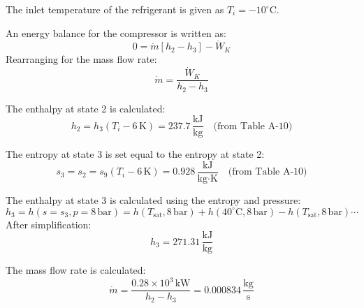 The inlet temperature of the refrigerant is given as \( T_i = -10^\circ\text{C} \).  

An energy balance for the compressor is written as:  
\[
0 = \dot{m} [h_2 - h_3] - \dot{W}_K
\]  
Rearranging for the mass flow rate:  
\[
\dot{m} = \frac{\dot{W}_K}{h_2 - h_3}
\]  

The enthalpy at state 2 is calculated:  
\[
h_2 = h_3(T_i - 6 \, \text{K}) = 237.7 \, \frac{\text{kJ}}{\text{kg}} \quad \text{(from Table A-10)}
\]  

The entropy at state 3 is set equal to the entropy at state 2:  
\[
s_3 = s_2 = s_9(T_i - 6 \, \text{K}) = 0.928 \, \frac{\text{kJ}}{\text{kg·K}} \quad \text{(from Table A-10)}
\]  

The enthalpy at state 3 is calculated using the entropy and pressure:  
\[
h_3 = h(s = s_3, p = 8 \, \text{bar}) = h(T_{\text{sat}}, 8 \, \text{bar}) + h(40^\circ\text{C}, 8 \, \text{bar}) - h(T_{\text{sat}}, 8 \, \text{bar}) \cdots
\]  
After simplification:  
\[
h_3 = 271.31 \, \frac{\text{kJ}}{\text{kg}}
\]  

The mass flow rate is calculated:  
\[
\dot{m} = \frac{0.28 \times 10^3 \, \text{kW}}{h_2 - h_3} = 0.000834 \, \frac{\text{kg}}{\text{s}}
\]